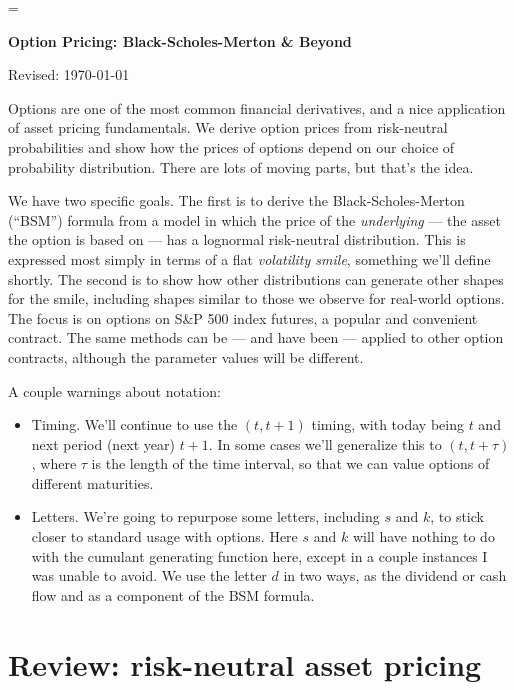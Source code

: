 \documentclass[11pt]{article}
\begin{document}
\parskip=\bigskipamount
\parindent=0.0in
\thispagestyle{empty}


\bigskip\bigskip
\centerline{\Large \bf Option Pricing: Black-Scholes-Merton \& Beyond}
\centerline{Revised: \today}

\bigskip
Options are one of the most common financial derivatives, and 
a nice application of asset pricing fundamentals.  
We derive option prices from risk-neutral probabilities 
and show how the prices of options depend on our choice of probability distribution. 
There are lots of moving parts, but that's the idea.  
 

We have two specific goals.
The first is to derive the Black-Scholes-Merton (``BSM'') formula from a model
in which the price of the {\it underlying\/} ---
the asset the option is based on ---
has a lognormal risk-neutral distribution.
This is expressed most simply in terms of a flat {\it volatility smile\/},
something we'll define shortly.
The second is to show how other distributions can generate other
shapes for the smile, including shapes similar to those
we observe for real-world options.
The focus is on options on S\&P 500 index futures,
a popular and convenient contract.
The same methods can be --- and have been ---
applied to other option contracts,
although the parameter values will be different.

A couple warnings about notation:
\begin{itemize}
\item Timing.  
We'll continue to use the $(t, t+1)$ timing,
with today being $t$ and next period (next year) $t+1$.
In some cases we'll generalize this to $(t,t+\tau)$,
where $\tau$ is the length of the time interval,
so that we can value options of different maturities.

\item Letters.
We're going to repurpose some letters, including $s$ and $k$,
to stick closer to standard usage with options.  
Here $s$ and $k$ will have nothing to do with the cumulant generating function here,
except in a couple instances I was unable to avoid.
We use the letter $d$ in two ways, 
as the dividend or cash flow and as a component of the BSM formula.  
\end{itemize} 

\section{Review:  risk-neutral asset pricing}
\label{sec:review}
\end{document}
